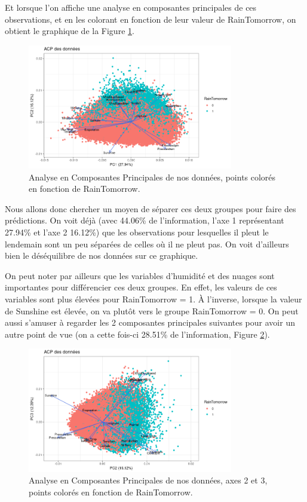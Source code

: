 \documentclass{article}
\begin{document}
Et lorsque l'on affiche une analyse en composantes principales de ces observations, et en les colorant en fonction de leur valeur de RainTomorrow, on obtient le graphique de la Figure \ref{fig:pca_raintomorrow}.

\begin{figure}[htp]
    \centering
    \includegraphics[width=0.8\textwidth]{Images/pca/pca.png}
    \caption{Analyse en Composantes Principales de nos données, points colorés en fonction de RainTomorrow.}
    \label{fig:pca_raintomorrow}
\end{figure}

Nous allons donc chercher un moyen de séparer ces deux groupes pour faire des prédictions. On voit déjà (avec 44.06\% de l'information, l'axe 1 représentant 27.94\% et l'axe 2 16.12\%) que les observations pour lesquelles il pleut le lendemain sont un peu séparées de celles où il ne pleut pas. On voit d'ailleurs bien le déséquilibre de nos données sur ce graphique.

On peut noter par ailleurs que les variables d'humidité et des nuages sont importantes pour différencier ces deux groupes. En effet, les valeurs de ces variables sont plus élevées pour RainTomorrow = 1. À l'inverse, lorsque la valeur de Sunshine est élevée, on va plutôt vers le groupe RainTomorrow = 0. On peut aussi s'amuser à regarder les 2 composantes principales suivantes pour avoir un autre point de vue (on a cette fois-ci 28.51\% de l'information, Figure \ref{fig:pca_raintomorrow2}).

\begin{figure}[htp]
    \centering
    \includegraphics[width=0.8\textwidth]{Images/pca/pca2.png}
    \caption{Analyse en Composantes Principales de nos données, axes 2 et 3, points colorés en fonction de RainTomorrow.}
    \label{fig:pca_raintomorrow2}
\end{figure}
\end{document}

